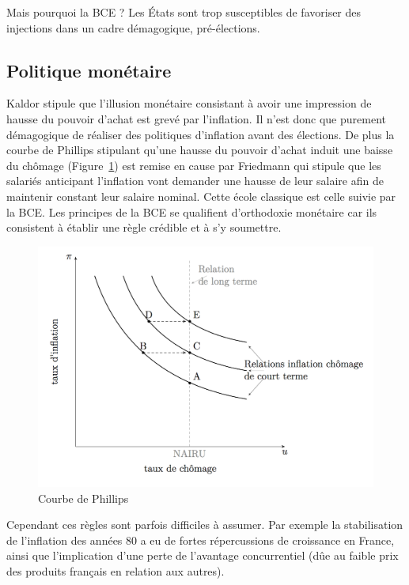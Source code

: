 Mais pourquoi la BCE ? Les États sont trop susceptibles de favoriser des injections dans un cadre démagogique, pré-élections. 

\subsection{Politique monétaire} %
\label{sub:politique_monetaire}

Kaldor stipule que l'illusion monétaire consistant à avoir une impression de hausse du pouvoir d'achat est grevé par l'inflation. Il n'est donc que purement 
démagogique de réaliser des politiques d'inflation avant des élections. De plus la courbe de Phillips stipulant qu'une hausse du pouvoir d'achat induit 
une baisse du chômage (Figure~\ref{fig:courbe_phillips}) est remise en cause par Friedmann qui stipule que les salariés anticipant l'inflation vont demander une hausse de
leur salaire afin de maintenir constant leur salaire nominal. Cette école classique est celle suivie par la BCE. Les principes de la BCE se qualifient 
d'orthodoxie monétaire car ils consistent à établir une règle crédible et à s'y soumettre. 
\begin{figure}[h]
	\begin{center}
		\includegraphics[scale=0.5]{./img/im3}
		
	\end{center}
	\caption{Courbe de Phillips}
  \label{fig:courbe_phillips}
\end{figure}
\newpage

Cependant ces règles sont parfois difficiles à assumer. Par exemple la stabilisation de l'inflation des années 80 a eu de fortes répercussions de croissance  en France, ainsi que l'implication d'une perte de l'avantage concurrentiel (dûe au faible prix des produits français en relation aux autres).

